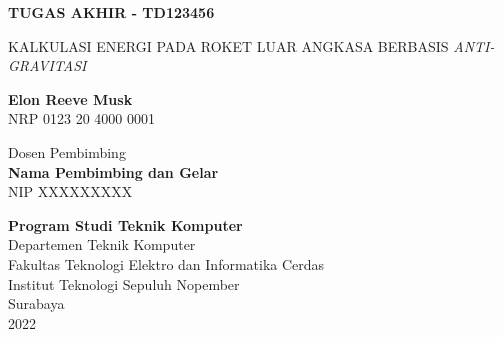 \begin{flushleft}
  \fontsize{14pt}{17}
  \selectfont
  \textbf{TUGAS AKHIR - TD123456}
\end{flushleft}

\vspace{5ex}

\begin{flushleft}
  \fontsize{18pt}{22}
  \selectfont
  KALKULASI ENERGI PADA ROKET LUAR ANGKASA BERBASIS \emph{ANTI-GRAVITASI}
\end{flushleft}

\vspace{6ex}

\begin{flushleft}
  \fontsize{14pt}{17}
  \selectfont
  \textbf{Elon Reeve Musk}
  \\
  NRP 0123 20 4000 0001
\end{flushleft}

\vspace{6ex}

\begin{flushleft}
  \fontsize{14pt}{17}
  \selectfont
  Dosen Pembimbing \\
  \textbf{Nama Pembimbing dan Gelar} \\
  NIP XXXXXXXXX \\
\end{flushleft}

\vspace{6ex}

\begin{flushleft}
  \fontsize{12pt}{15}
  \selectfont
  \textbf{Program Studi Teknik Komputer}\\
  Departemen Teknik Komputer\\
  Fakultas Teknologi Elektro dan Informatika Cerdas\\
  Institut Teknologi Sepuluh Nopember\\
  Surabaya\\
  2022
\end{flushleft}
